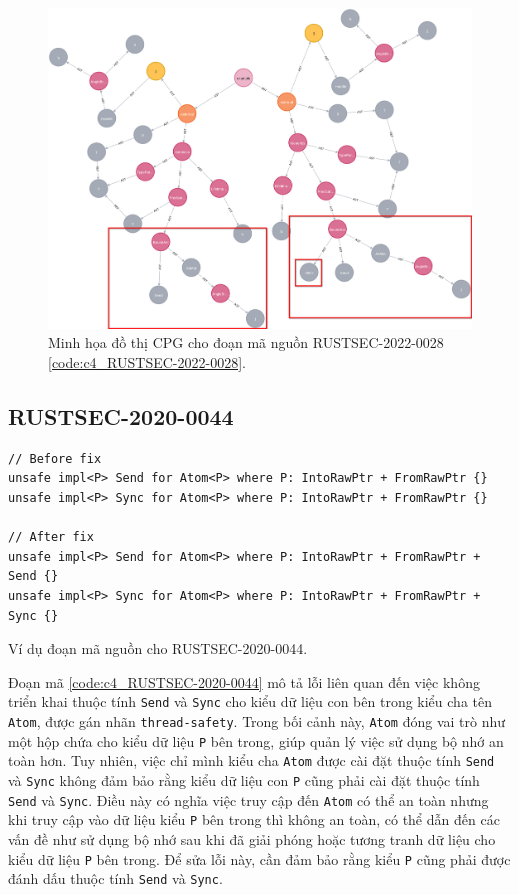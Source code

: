\begin{figure}[H]
    \includegraphics[width=1\columnwidth]{figures/c4/c4_RUSTSEC-2022-0028.png}
    \centering
    \caption{Minh họa đồ thị CPG cho đoạn mã nguồn RUSTSEC-2022-0028 \ref{code:c4_RUSTSEC-2022-0028}.}
    \label{img:c4_RUSTSEC-2022-0028}
\end{figure}


\subsection{RUSTSEC-2020-0044}

\begin{listing}[H]
\begin{verbatim}
// Before fix
unsafe impl<P> Send for Atom<P> where P: IntoRawPtr + FromRawPtr {}
unsafe impl<P> Sync for Atom<P> where P: IntoRawPtr + FromRawPtr {}

// After fix
unsafe impl<P> Send for Atom<P> where P: IntoRawPtr + FromRawPtr + Send {}
unsafe impl<P> Sync for Atom<P> where P: IntoRawPtr + FromRawPtr + Sync {}
\end{verbatim}
\caption{Ví dụ đoạn mã nguồn cho RUSTSEC-2020-0044.}
\label{code:c4_RUSTSEC-2020-0044}
\end{listing}

Đoạn mã \ref{code:c4_RUSTSEC-2020-0044} mô tả lỗi liên quan đến việc không triển khai thuộc tính \texttt{Send} và \texttt{Sync} cho kiểu dữ liệu con bên trong kiểu cha tên \texttt{Atom}, được gán nhãn \texttt{thread-safety}.
Trong bối cảnh này, \texttt{Atom} đóng vai trò như một hộp chứa cho kiểu dữ liệu \texttt{P} bên trong, giúp quản lý việc sử dụng bộ nhớ an toàn hơn.
Tuy nhiên, việc chỉ mình kiểu cha \texttt{Atom} được cài đặt thuộc tính \texttt{Send} và \texttt{Sync} không đảm bảo rằng kiểu dữ liệu con \texttt{P} cũng phải cài đặt thuộc tính \texttt{Send} và \texttt{Sync}.
Điều này có nghĩa việc truy cập đến \texttt{Atom} có thể an toàn nhưng khi truy cập vào dữ liệu kiểu \texttt{P} bên trong thì không an toàn, có thể dẫn đến các vấn đề như sử dụng bộ nhớ sau khi đã giải phóng hoặc tương tranh dữ liệu cho kiểu dữ liệu \texttt{P} bên trong.
Để sửa lỗi này, cần đảm bảo rằng kiểu \texttt{P} cũng phải được đánh dấu thuộc tính \texttt{Send} và \texttt{Sync}.

